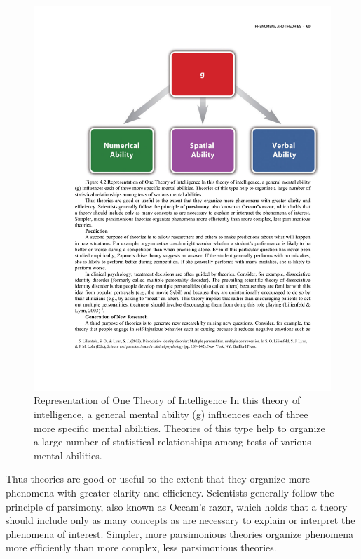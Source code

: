 \begin{figure}
 
      \includegraphics[width=\linewidth]{figures/C4Intelligence.pdf}
 
      \caption{Representation of One Theory of Intelligence In this theory of intelligence, a general mental ability (g) influences each of three more specific mental abilities. Theories of this type help to organize a large number of statistical relationships among tests of various mental abilities.
}
 
      \label{fig:Intelligence}
 
\end{figure}

Thus theories are good or useful to the extent that they organize more phenomena with greater clarity and efficiency. Scientists generally follow the principle of parsimony, also known as Occam's razor, which holds that a theory should include only as many concepts as are necessary to explain or interpret the phenomena of interest. Simpler, more parsimonious theories organize phenomena more efficiently than more complex, less parsimonious theories.

